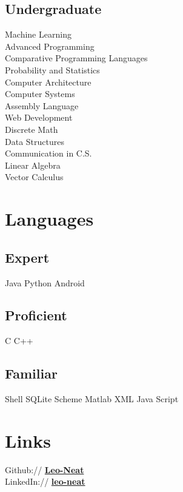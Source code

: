 \documentclass[letterpaper]{deedy-resume} %
\begin{document}
\begin{minipage}[t]{0.30\textwidth}
\subsection{Undergraduate}


Machine Learning \\
Advanced Programming \\
Comparative Programming Languages \\
Probability and Statistics \\
Computer Architecture \\ 
Computer Systems \\
Assembly Language \\
Web Development \\
Discrete Math \\
Data Structures \\
Communication in C.S. \\
Linear Algebra \\
Vector Calculus \\


\sectionspace %


\section{Languages}


\subsection{Expert}
Java \textbullet{} Python \textbullet{} Android \\ 
\subsection{Proficient}
C \textbullet{} C++ \\
\subsection{Familiar}
 Shell  \textbullet{} SQLite \textbullet{} Scheme \textbullet{} Matlab \textbullet{} XML \textbullet{} Java Script 

\sectionspace %


\section{Links} 

Github:// \href{https://github.com/Leo-Neat}{\bf Leo-Neat} \\
LinkedIn:// \href{https://www.linkedin.com/in/leo-neat-82b34b130/}{\bf leo-neat} \\

\sectionspace %

\end{minipage} %
\end{document}
